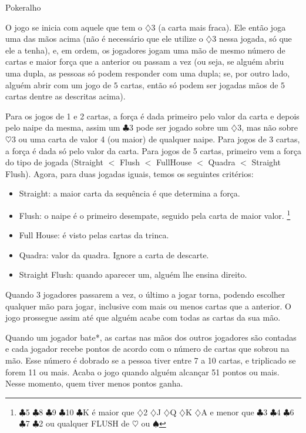 \begin{subsecao}{Pokeralho}
\begin{itemize}
\end{itemize}

O jogo se inicia com aquele que tem o $\diamondsuit$3 (a carta mais fraca). Ele
então joga uma das mãos acima (não é necessário que ele utilize
o $\diamondsuit$3 nessa jogada, só que ele a tenha), e, em ordem, os jogadores
jogam uma mão de mesmo número de cartas e maior força que a anterior ou passam
a vez (ou seja, se alguém abriu uma dupla, as pessoas só podem responder com
uma dupla; se, por outro lado, alguém abrir com um jogo de $5$ cartas, então só podem ser
jogadas mãos de $5$ cartas dentre as descritas acima). 

Para os jogos de 1 e 2 cartas, a força é dada primeiro pelo valor da carta e
depois pelo naipe da mesma, assim um $\clubsuit$3  pode ser jogado sobre
um $\diamondsuit$3, mas não sobre $\heartsuit$3 ou uma carta de valor 4 (ou
maior) de qualquer naipe. Para jogos de 3 cartas, a força é dada só pelo valor
da carta. Para jogos de 5 cartas, primeiro vem a força do tipo de
jogada (Straight $<$ Flush $<$ FullHouse $<$ Quadra $<$ Straight Flush). Agora, para duas
jogadas iguais, temos os seguintes critérios:
\begin{itemize}
	\item Straight: a maior carta da sequência é que determina a força.
	\item Flush: o naipe é o primeiro desempate, seguido pela carta de maior
valor. \footnote{ $\clubsuit$5 $\clubsuit$8 $\clubsuit$9 $\clubsuit$10 $\clubsuit$K é
maior que $\diamondsuit$2 $\diamondsuit$J $\diamondsuit$Q $\diamondsuit$K
$\diamondsuit$A e menor que $\clubsuit$3 $\clubsuit$4 $\clubsuit$6 $\clubsuit$7
$\clubsuit$2 ou qualquer FLUSH de $\heartsuit$  ou $\spadesuit$ }
	\item Full House: é visto pelas cartas da trinca.	
	\item Quadra: valor da quadra. Ignore a carta de descarte.
	\item Straight Flush: quando aparecer um, alguém lhe ensina direito.
\end{itemize}

Quando 3 jogadores passarem a vez, o último a jogar torna, podendo escolher
qualquer mão para jogar, inclusive com mais ou menos cartas que a anterior. O
jogo prossegue assim até que alguém acabe com todas as cartas da sua mão. 

Quando um jogador bate*, as cartas nas mãos dos outros jogadores são contadas e
cada jogador recebe pontos de acordo com o número de cartas que sobrou na mão.
Esse número é dobrado se a pessoa tiver entre 7 a 10 cartas, e triplicado se
forem 11 ou mais. Acaba o jogo quando alguém alcançar 51 pontos ou mais. Nesse
momento, quem tiver menos pontos ganha.


\end{subsecao}
